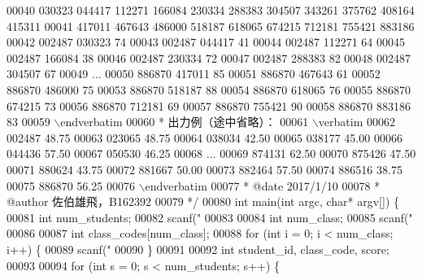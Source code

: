 \begin{DoxyCode}
{00040 \textcolor{comment}{030323 044417 112271 166084 230334 288383 304507 343261 375762 408164 415311}
00041 \textcolor{comment}{417011 467643 486000 518187 618065 674215 712181 755421 883186}
00042 \textcolor{comment}{002487 030323 74}
00043 \textcolor{comment}{002487 044417 41}
00044 \textcolor{comment}{002487 112271 64}
00045 \textcolor{comment}{002487 166084 38}
00046 \textcolor{comment}{002487 230334 72}
00047 \textcolor{comment}{002487 288383 82}
00048 \textcolor{comment}{002487 304507 67}
00049 \textcolor{comment}{...}
00050 \textcolor{comment}{886870 417011 85}
00051 \textcolor{comment}{886870 467643 61}
00052 \textcolor{comment}{886870 486000 75}
00053 \textcolor{comment}{886870 518187 88}
00054 \textcolor{comment}{886870 618065 76}
00055 \textcolor{comment}{886870 674215 73}
00056 \textcolor{comment}{886870 712181 69}
00057 \textcolor{comment}{886870 755421 90}
00058 \textcolor{comment}{886870 883186 83}
00059 \textcolor{comment}{\(\backslash\)endverbatim}
00060 \textcolor{comment}{  *  出力例（途中省略）：}
00061 \textcolor{comment}{\(\backslash\)verbatim}
00062 \textcolor{comment}{002487 48.75}
00063 \textcolor{comment}{023065 48.75}
00064 \textcolor{comment}{038034 42.50}
00065 \textcolor{comment}{038177 45.00}
00066 \textcolor{comment}{044436 57.50}
00067 \textcolor{comment}{050530 46.25}
00068 \textcolor{comment}{...}
00069 \textcolor{comment}{874131 62.50}
00070 \textcolor{comment}{875426 47.50}
00071 \textcolor{comment}{880624 43.75}
00072 \textcolor{comment}{881667 50.00}
00073 \textcolor{comment}{882464 57.50}
00074 \textcolor{comment}{886516 38.75}
00075 \textcolor{comment}{886870 56.25}
00076 \textcolor{comment}{\(\backslash\)endverbatim}
00077 \textcolor{comment}{ *  @date   2017/1/10}
00078 \textcolor{comment}{ *  @author 佐伯雄飛，B162392}
00079 \textcolor{comment}{ */}
00080 \textcolor{keywordtype}{int} main(\textcolor{keywordtype}{int} argc, \textcolor{keywordtype}{char}* argv[]) \{
00081   \textcolor{keywordtype}{int} num\_students;
00082   scanf(\textcolor{stringliteral}{"%
00083 
00084   \textcolor{keywordtype}{int} num\_class;
00085   scanf(\textcolor{stringliteral}{"%
00086 
00087   \textcolor{keywordtype}{int} class\_codes[num\_class];
00088   \textcolor{keywordflow}{for} (\textcolor{keywordtype}{int} i = 0; i < num\_class; i++) \{
00089     scanf(\textcolor{stringliteral}{"%
00090   \}
00091 
00092   \textcolor{keywordtype}{int} student\_id, class\_code, score;
00093 
00094   \textcolor{keywordflow}{for} (\textcolor{keywordtype}{int} s = 0; s < num\_students; s++) \{
}}}}
\end{DoxyCode}
